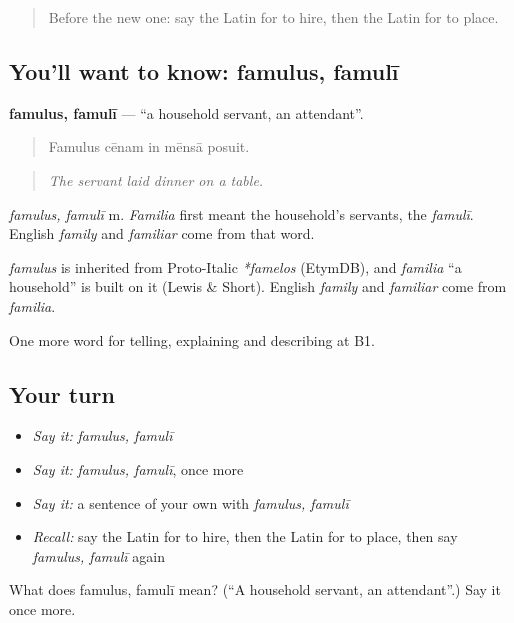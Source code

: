 \begin{quote}
Before the new one: say the Latin for to hire, then the Latin for to place.
\end{quote}

\subsection*{You'll want to know: famulus, famulī}
\textbf{famulus, famulī} — \textquotedblleft{}a household servant, an attendant\textquotedblright{}.

\begin{quote}
Famulus cēnam in mēnsā posuit.
\end{quote}

\begin{quote}
\emph{The servant laid dinner on a table.}
\end{quote}

\emph{famulus, famulī} m. \emph{Familia} first meant the household's servants, the \emph{famulī}. English \emph{family} and \emph{familiar} come from that word.

\begin{cousinweb}
\emph{famulus} is inherited from Proto-Italic \emph{*famelos} (EtymDB), and \emph{familia} \textquotedblleft{}a household\textquotedblright{} is built on it (Lewis \& Short). English \emph{family} and \emph{familiar} come from \emph{familia}.
\end{cousinweb}

\begin{grammarlens}[title={What you've built}]
One more word for telling, explaining and describing at B1.
\end{grammarlens}

\subsection*{Your turn}
\begin{itemize}
\raggedright
  \item \emph{Say it:} \emph{famulus, famulī}
  \item \emph{Say it:} \emph{famulus, famulī}, once more
  \item \emph{Say it:} a sentence of your own with \emph{famulus, famulī}
  \item \emph{Recall:} say the Latin for to hire, then the Latin for to place, then say \emph{famulus, famulī} again
\end{itemize}

\begin{tcolorbox}[breakable,colback=teal!4,colframe=teal!35!black,title={Before you move on}]
What does famulus, famulī mean? (\textquotedblleft{}A household servant, an attendant\textquotedblright{}.) Say it once more.
\end{tcolorbox}
